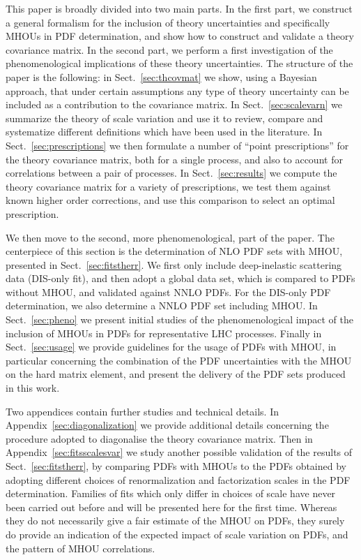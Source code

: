 This paper is broadly divided into two main parts.
%
In the  first part, we
construct a general formalism for the inclusion of theory uncertainties
and specifically MHOUs in PDF determination, and show how to construct and 
validate a theory covariance matrix.
%
In the second part, we
perform a first investigation of the phenomenological implications of
these theory uncertainties.
%
The structure of the paper is the following: in
Sect.~\ref{sec:thcovmat} we show, using a Bayesian approach,
that under certain assumptions any type of theory uncertainty can be included as a contribution
to the covariance matrix.
%
In Sect.~\ref{sec:scalevarn} we summarize
the theory of scale variation and use it to review,
compare  and systematize different definitions which have been used
in the literature.
%
In Sect.~\ref{sec:prescriptions} we then formulate
a number of ``point prescriptions'' for the theory covariance matrix, both for a single process, and also to account for 
correlations between a pair of processes.
In Sect.~\ref{sec:results} we compute the theory covariance matrix for
a variety of prescriptions, we test them against known higher
order corrections, and use this comparison to select an optimal prescription.

We then move to the second, more phenomenological, part of the paper.
The centerpiece of this section is the determination of NLO PDF sets
with MHOU, presented  in Sect.~\ref{sec:fitstherr}.
%
We first only include deep-inelastic
scattering data (DIS-only fit), and then adopt a global data set, which is
compared to PDFs without MHOU, and validated against NNLO PDFs.
%
For the DIS-only PDF determination, we  also
determine a NNLO PDF set including MHOU.
%
In Sect.~\ref{sec:pheno} we present initial studies of the phenomenological impact of the inclusion of MHOUs
in PDFs for representative LHC processes.
%
Finally in Sect.~\ref{sec:usage} we provide guidelines for the usage of PDFs
with MHOU, in particular concerning the combination of the PDF uncertainties
with the MHOU on the hard matrix element, and present the delivery of the
PDF sets produced in this work.

Two appendices contain further studies and technical details.
%
In Appendix~\ref{sec:diagonalization} we provide
additional details concerning the procedure adopted
to diagonalise  the theory covariance matrix.
%
Then in Appendix~\ref{sec:fitsscalesvar} we study another possible validation
of the results of Sect.~\ref{sec:fitstherr}, by comparing PDFs with MHOUs to
the PDFs obtained by adopting different choices of 
renormalization and factorization scales in the PDF determination.
Families of fits which
only differ in choices of scale have never been carried
out before and will be presented here for the first time.
Whereas they do  not necessarily give a fair estimate of the
MHOU on PDFs, they surely do provide an indication of the expected
impact of scale variation on PDFs, and the pattern of MHOU correlations.

